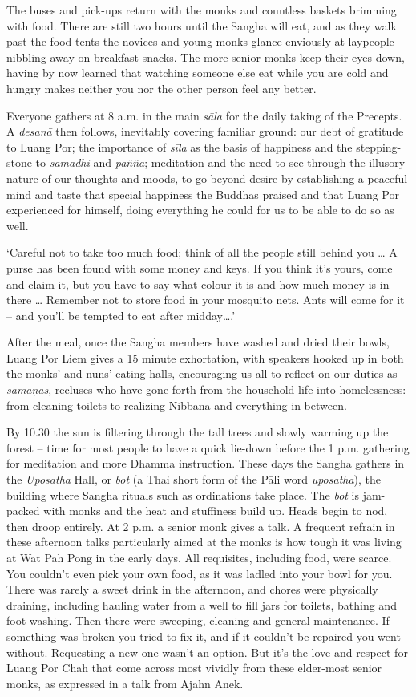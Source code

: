 The buses and pick-ups return with the monks and countless baskets
brimming with food. There are still two hours until the Sangha will eat, 
and as they walk past the food tents the novices and young monks glance
enviously at laypeople nibbling away on breakfast snacks. The more
senior monks keep their eyes down, having by now learned that watching
someone else eat while you are cold and hungry makes neither you nor the
other person feel any better. 

Everyone gathers at 8 a.m. in the main \emph{sāla} for the daily taking
of the Precepts. A \emph{desanā} then follows, inevitably covering
familiar ground: our debt of gratitude to Luang Por; the importance of
\emph{sīla} as the basis of happiness and the stepping-stone to
\emph{samādhi} and \emph{pañña}; meditation and the need to see through
the illusory nature of our thoughts and moods, to go beyond desire by
establishing a peaceful mind and taste that special happiness the
Buddhas praised and that Luang Por experienced for himself, doing
everything he could for us to be able to do so as well. 

`Careful not to take too much food; think of all the people still behind
you \ldots{} A purse has been found with some money and keys. If you
think it's yours, come and claim it, but you have to say what colour it
is and how much money is in there \ldots{} Remember not to store food
in your mosquito nets. Ants will come for it -- and you'll be tempted to
eat after midday\ldots{}.'

After the meal, once the Sangha members have washed and dried their
bowls, Luang Por Liem gives a 15 minute exhortation, with speakers
hooked up in both the monks' and nuns' eating halls, encouraging us all
to reflect on our duties as \emph{samaṇas}, recluses who have gone forth
from the household life into homelessness: from cleaning toilets to
realizing Nibbāna and everything in between. 

By 10.30 the sun is filtering through the tall trees and slowly warming
up the forest -- time for most people to have a quick lie-down before
the 1 p.m. gathering for meditation and more Dhamma instruction. These
days the Sangha gathers in the \emph{Uposatha} Hall, or \emph{bot} (a
Thai short form of the Pāli word \emph{uposatha}), the building where
Sangha rituals such as ordinations take place. The \emph{bot} is
jam-packed with monks and the heat and stuffiness build up. Heads begin
to nod, then droop entirely. At 2 p.m. a senior monk gives a talk. A
frequent refrain in these afternoon talks particularly aimed at the
monks is how tough it was living at Wat Pah Pong in the early days. All
requisites, including food, were scarce. You couldn't even pick your own
food, as it was ladled into your bowl for you. There was rarely a sweet
drink in the afternoon, and chores were physically draining, including
hauling water from a well to fill jars for toilets, bathing and
foot-washing. Then there were sweeping, cleaning and general
maintenance. If something was broken you tried to fix it, and if it
couldn't be repaired you went without. Requesting a new one wasn't an
option. But it's the love and respect for Luang Por Chah that come
across most vividly from these elder-most senior monks, as expressed in
a talk from Ajahn Anek.

